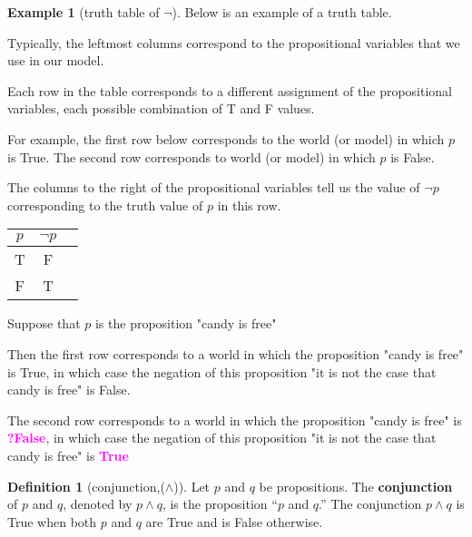 \documentclass[letterpaper,10pt]{article}
\theoremstyle{plain}
\theoremstyle{definition}
\newtheorem{defn}[thm]{Definition}
\newtheorem{exmp}[thm]{Example}
\theoremstyle{remark}
\providecommand{\land}{\ensuremath{\wedge}}
\providecommand{\todo}[1]{\textcolor{magenta}{\textbf{#1}}}
\begin{document}
\begin{exmp}[truth table of $\lnot$]
Below is an example of a truth table. 

Typically, the leftmost columns correspond to the propositional variables that we use in our model. 

Each row in the table corresponds to a different assignment of the propositional variables, each possible combination of T and F values.

For example, the first row below corresponds to the world (or model) in which $p$ is True. The second row corresponds to world (or model) in which $p$ is False. 

The columns to the right of the propositional variables tell us the value of $\lnot p$ corresponding to the truth value of $p$ in this row.

\begin{center}
\begin{tabular}{ | c | c | c |} 
  \hline
 $p$& $ \lnot p$ \\
 \hline
  T & F \\ 
  F & T \\ 
  \hline
\end{tabular}
\end{center}
\end{exmp}

Suppose that $p$ is the proposition "candy is free"


Then the first row corresponds to a world in which the proposition "candy is free" is True, in which case the negation of this proposition "it is not the case that candy is free" is False.

The second row corresponds to a world in which the proposition "candy is free" is \todo{?False}, in which case the negation of this proposition "it is not the case that candy is free" is \todo{True}

\begin{defn}[conjunction,($\land$)]
Let $p$ and $q$ be propositions. The \textbf{conjunction} of $p$ and $q$, denoted by $p \land q$, is the proposition
“$p$ and $q$.” The conjunction $p \land q$ is True when both $p$ and $q$ are True and is False otherwise.
\end{defn}
\end{document}
